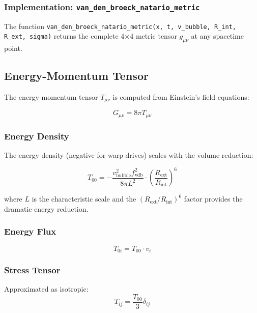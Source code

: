 \subsubsection{Implementation: \texttt{van\_den\_broeck\_natario\_metric}}

The function \texttt{van\_den\_broeck\_natario\_metric(x, t, v\_bubble, R\_int, R\_ext, sigma)} returns the complete 4×4 metric tensor $g_{\mu\nu}$ at any spacetime point.

\subsection{Energy-Momentum Tensor}

The energy-momentum tensor $T_{\mu\nu}$ is computed from Einstein's field equations:

\begin{equation}
G_{\mu\nu} = 8\pi T_{\mu\nu}
\end{equation}

\subsubsection{Energy Density}

The energy density (negative for warp drives) scales with the volume reduction:

\begin{equation}
T_{00} = -\frac{v_{\text{bubble}}^2 f_{\text{vdb}}^2}{8\pi L^2} \cdot \left(\frac{R_{\text{ext}}}{R_{\text{int}}}\right)^6
\end{equation}

where $L$ is the characteristic scale and the $(R_{\text{ext}}/R_{\text{int}})^6$ factor provides the dramatic energy reduction.

\subsubsection{Energy Flux}

\begin{equation}
T_{0i} = T_{00} \cdot v_i
\end{equation}

\subsubsection{Stress Tensor}

Approximated as isotropic:
\begin{equation}
T_{ij} = \frac{T_{00}}{3} \delta_{ij}
\end{equation}

